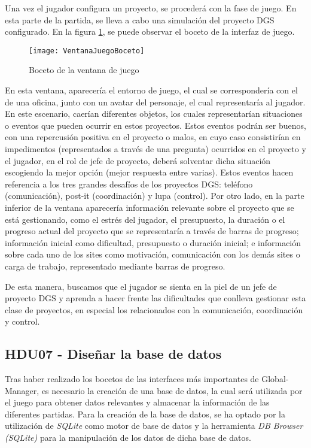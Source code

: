 Una vez el jugador configura un proyecto, se procederá con la fase de juego. En esta parte de la partida, se lleva a cabo una simulación del proyecto DGS configurado. En la figura \ref{fig:VentanaJuegoBoceto}, se puede observar el boceto de la interfaz de juego.

\begin{figure}[htb]
	\centering
	\texttt{[image: VentanaJuegoBoceto]}
	\caption[Boceto de la ventana de juego]{Boceto de la ventana de juego}
	\label{fig:VentanaJuegoBoceto}
\end{figure}

En esta ventana, aparecería el entorno de juego, el cual se correspondería con el de una oficina, junto con un avatar del personaje, el cual representaría al jugador. En este escenario, caerían diferentes objetos, los cuales representarían situaciones o eventos que pueden ocurrir en estos proyectos. Estos eventos podrán ser buenos, con una repercusión positiva en el proyecto o malos, en cuyo caso consistirían en impedimentos (representados a través de una pregunta) ocurridos en el proyecto y el jugador, en el rol de jefe de proyecto, deberá solventar dicha situación escogiendo la mejor opción (mejor respuesta entre varias). Estos eventos hacen referencia a los tres grandes desafíos de los proyectos DGS: teléfono (comunicación), post-it (coordinación) y lupa (control). Por otro lado, en la parte inferior de la ventana aparecería información relevante sobre el proyecto que se está gestionando, como el estrés del jugador, el presupuesto, la duración o el progreso actual del proyecto que se representaría a través de barras de progreso; información inicial como dificultad, presupuesto o duración inicial; e información sobre cada uno de los sites como motivación, comunicación con los demás sites o carga de trabajo, representado mediante barras de progreso.

De esta manera, buscamos que el jugador se sienta en la piel de un jefe de proyecto DGS y aprenda a hacer frente las dificultades que conlleva gestionar esta clase de proyectos, en especial los relacionados con la comunicación, coordinación y control.

\subsection{HDU07 - Diseñar la base de datos}
\label{sec:HDU07}

Tras haber realizado los bocetos de las interfaces más importantes de Global-Manager, es necesario la creación de una base de datos, la cual será utilizada por el juego para obtener datos relevantes y almacenar la información de las diferentes partidas. Para la creación de la base de datos, se ha optado por la utilización de \emph{SQLite} como motor de base de datos y la herramienta \emph{DB Browser (SQLite)} para la manipulación de los datos de dicha base de datos.


